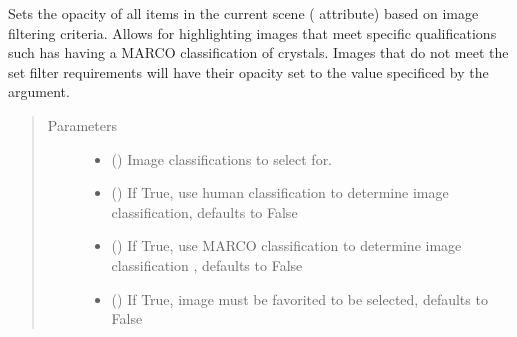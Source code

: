 \documentclass[letterpaper,10pt,english]{sphinxmanual}
\begin{document}
\begin{fulllineitems}
\begin{fulllineitems}
\label{\detokenize{polo.widgets:polo.widgets.plate_viewer.plateViewer.set_scene_opacity_from_filters}}
Sets the opacity of all items in the current scene ( attribute)
based on image filtering criteria. Allows for highlighting images that
meet specific qualifications such has having a MARCO classification of
crystals. Images that do not meet the set filter requirements will have
their opacity set to the value specificed by the 
argument.
\begin{quote}\begin{description}
\item[{Parameters}] \leavevmode\begin{itemize}
\item {} 
 () \textendash{} Image classifications to select for.

\item {} 
 (\sphinxstyleliteralemphasis{\sphinxupquote{, }}) \textendash{} If True, use human classification to determine image
classification, defaults to False

\item {} 
 (\sphinxstyleliteralemphasis{\sphinxupquote{, }}) \textendash{} If True, use MARCO classification to determine image
classification , defaults to False

\item {} 
 (\sphinxstyleliteralemphasis{\sphinxupquote{, }}) \textendash{} If True, image must be favorited to be
selected, defaults to False


\end{itemize}
\end{description}
\end{quote}
\end{fulllineitems}
\end{fulllineitems}
\end{document}
